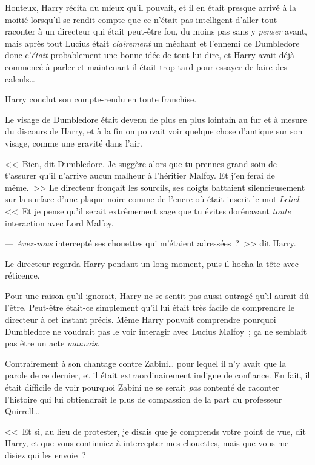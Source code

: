 Honteux, Harry récita du mieux qu'il pouvait, et il en était presque arrivé à la moitié lorsqu'il se rendit compte que ce n'était pas intelligent d'aller tout raconter à un directeur qui était peut-être fou, du moins pas sans y \emph{penser} avant, mais après tout Lucius était \emph{clairement} un méchant et l'ennemi de Dumbledore donc c'\emph{était} probablement une bonne idée de tout lui dire, et Harry avait déjà commencé à parler et maintenant il était trop tard pour essayer de faire des calculs…

Harry conclut son compte-rendu en toute franchise.

Le visage de Dumbledore était devenu de plus en plus lointain au fur et à mesure du discours de Harry, et à la fin on pouvait voir quelque chose d'antique sur son visage, comme une gravité dans l'air.

<<~Bien, dit Dumbledore. Je suggère alors que tu prennes grand soin de t'assurer qu'il n'arrive aucun malheur à l'héritier Malfoy. Et j'en ferai de même.~>> Le directeur fronçait les sourcils, ses doigts battaient silencieusement sur la surface d'une plaque noire comme de l'encre où était inscrit le mot \emph{Leliel}. <<~Et je pense qu'il serait extrêmement sage que tu évites dorénavant \emph{toute} interaction avec Lord Malfoy.

--- \emph{Avez-vous} intercepté ses chouettes qui m'étaient adressées~?~>> dit Harry.

Le directeur regarda Harry pendant un long moment, puis il hocha la tête avec réticence.

Pour une raison qu'il ignorait, Harry ne se sentit pas aussi outragé qu'il aurait dû l'être. Peut-être était-ce simplement qu'il lui était très facile de comprendre le directeur à cet instant précis. Même Harry pouvait comprendre pourquoi Dumbledore ne voudrait pas le voir interagir avec Lucius Malfoy~; ça ne semblait pas être un acte \emph{mauvais}.

Contrairement à son chantage contre Zabini… pour lequel il n'y avait que la parole de ce dernier, et il était extraordinairement indigne de confiance. En fait, il était difficile de voir pourquoi Zabini ne se serait \emph{pas} contenté de raconter l'histoire qui lui obtiendrait le plus de compassion de la part du professeur Quirrell…

<<~Et si, au lieu de protester, je disais que je comprends votre point de vue, dit Harry, et que vous continuiez à intercepter mes chouettes, mais que vous me disiez qui les envoie~?

